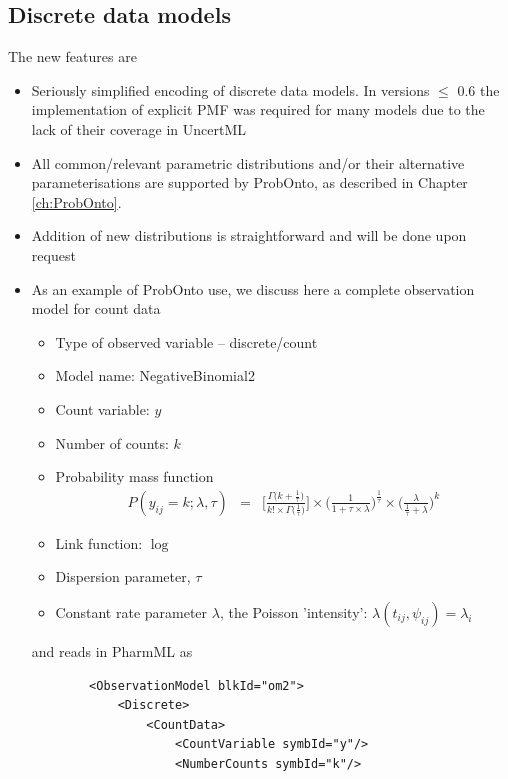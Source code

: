 \subsection{Discrete data models}
The new features are 
\begin{itemize}
\item
Seriously simplified encoding of discrete data models. In \pml versions $\leq$ 0.6 
the implementation of explicit PMF was required for many models due to the lack of 
their coverage in UncertML
\item
All common/relevant parametric distributions and/or their alternative parameterisations 
are supported by ProbOnto, as described in Chapter \ref{ch:ProbOnto}.
\item
Addition of new distributions is straightforward and will be done upon request
\item
As an example of ProbOnto use, we discuss here a complete observation model for count data
\begin{itemize}
\item
Type of observed variable -- discrete/count
\item
Model name: NegativeBinomial2
\item
Count variable: $y$
\item
Number of counts: $k$
\item
Probability mass function
\begin{eqnarray}
P(y_{ij} = k; \lambda, \tau) &=& \Bigg[ \frac{\Gamma \big( k + \frac{1}{\tau} \big)}{k! \times \Gamma \big(\frac{1}{\tau} \big)} \Bigg] \times \Bigg( \frac{1}{1 + \tau \times \lambda} \Bigg)^{\frac{1}{\tau}} \times \Bigg(\frac{\lambda}{\frac{1}{\tau} + \lambda} \Bigg)^k \nonumber
\end{eqnarray}
\item
Link function: $\log$
\item
Dispersion parameter, $\tau$
\item
Constant rate parameter $\lambda$, the Poisson 'intensity': $\lambda(t_{ij}, \psi_{ij}) = \lambda_{i}$
\end{itemize}
and reads in PharmML as
\lstset{language=XML}
\begin{lstlisting}
        <ObservationModel blkId="om2">
            <Discrete>
                <CountData>
                    <CountVariable symbId="y"/>
                    <NumberCounts symbId="k"/>
                    

\end{lstlisting}
\end{itemize}
